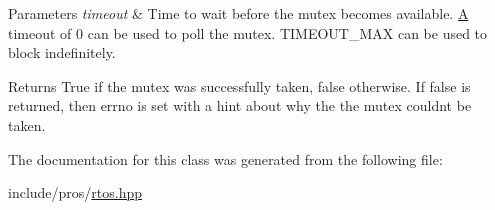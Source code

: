 \begin{DoxyParams}{Parameters}
{\em timeout} & Time to wait before the mutex becomes available. \mbox{\hyperlink{structA}{A}} timeout of 0 can be used to poll the mutex. T\+I\+M\+E\+O\+U\+T\+\_\+\+M\+AX can be used to block indefinitely.\\
\hline
\end{DoxyParams}
\begin{DoxyReturn}{Returns}
True if the mutex was successfully taken, false otherwise. If false is returned, then errno is set with a hint about why the the mutex couldn\textquotesingle{}t be taken. 
\end{DoxyReturn}


The documentation for this class was generated from the following file\+:\begin{DoxyCompactItemize}
\item 
include/pros/\mbox{\hyperlink{rtos_8hpp}{rtos.\+hpp}}\end{DoxyCompactItemize}
